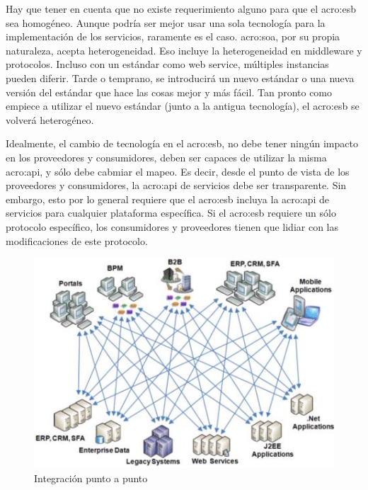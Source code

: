 Hay que tener en cuenta que no existe requerimiento alguno para que el \gls{acro:esb} sea homogéneo.  Aunque podría ser mejor usar una sola tecnología para la implementación de los servicios, raramente es el caso. \gls{acro:soa}, por su propia naturaleza, acepta heterogeneidad. Eso incluye la heterogeneidad en middleware y protocolos. Incluso con un estándar como web service, múltiples instancias pueden diferir.  Tarde o temprano, se introducirá un nuevo estándar o una nueva versión del estándar que hace las cosas mejor y más fácil. Tan pronto como empiece a utilizar el nuevo estándar (junto a la antigua tecnología), el \gls{acro:esb} se volverá heterogéneo\cite[p.~49]{josuttis2007}.

Idealmente, el cambio de tecnología en el \gls{acro:esb}, no debe tener ningún impacto en los proveedores y consumidores, deben ser capaces de utilizar la misma \gls{acro:api}, y sólo debe cabmiar el mapeo.
Es decir, desde el punto de vista de los proveedores y consumidores, la \gls{acro:api} de servicios debe ser transparente. Sin embargo, esto por lo general requiere que el \gls{acro:esb} incluya la \gls{acro:api} de servicios para cualquier plataforma específica. Si el \gls{acro:esb} requiere un sólo protocolo específico, los consumidores y proveedores tienen que lidiar con las modificaciones de este protocolo\cite[p.~50]{josuttis2007}.


\begin{figure}[H]
  \includegraphics[width=\linewidth]{src/images/02-capitulo-2/tecnologias/esb/point-to-point-integration.png}
  \caption{Integración punto a punto}
  \label{fig:point-to-point-integration}
\end{figure}

